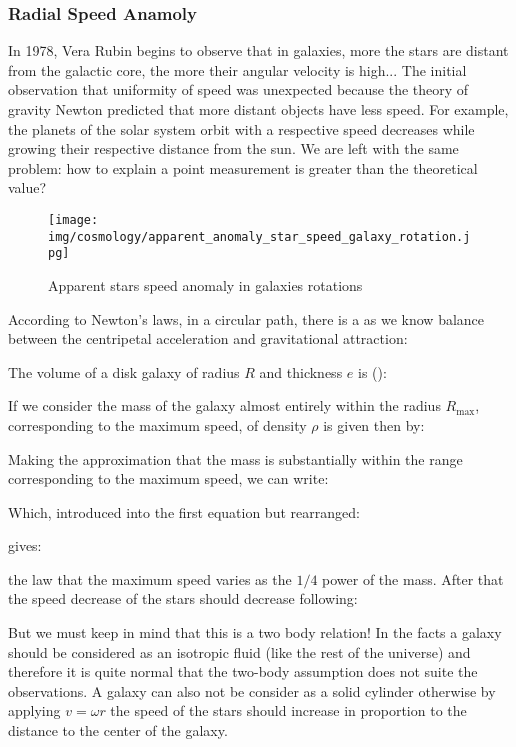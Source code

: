 	\subsubsection{Radial Speed Anamoly}
	In 1978, Vera Rubin begins to observe that in galaxies, more the stars are distant from the galactic core, the more their angular velocity is high... The initial observation that uniformity of speed was unexpected because the theory of gravity Newton predicted that more distant objects have less speed. For example, the planets of the solar system orbit with a respective speed decreases while growing their respective distance from the sun. We are left with the same problem: how to explain a point measurement is greater than the theoretical value?
	\begin{figure}[H]
		\begin{center}
		\texttt{[image: img/cosmology/apparent\_anomaly\_star\_speed\_galaxy\_rotation.jpg]}
		\end{center}	
		\caption{Apparent stars speed anomaly in galaxies rotations}
	\end{figure}
	According to Newton's laws, in a circular path, there is a as we know balance between the centripetal acceleration and gravitational attraction:
	
	The volume of a disk galaxy of radius $R$ and thickness $e$ is ():
	
	If we consider the mass of the galaxy almost entirely within the radius $R _ {\max}$, corresponding to the maximum speed, of density $\rho$ is given then by:
	
	Making the approximation that the mass is substantially within the range corresponding to the maximum speed, we can write:
	
	Which, introduced into the first equation but rearranged:
	
	 gives:
	
	the law that the maximum speed varies as the $1/4$ power of the mass. After that the speed decrease of the stars should decrease following:
	
	But we must keep in mind that this is a two body relation! In the facts a galaxy should be considered as an isotropic fluid (like the rest of the universe) and therefore it is quite normal that the two-body assumption does not suite the observations. A galaxy can also not be consider as a solid cylinder otherwise by applying $v=\omega r$ the speed of the stars should increase in proportion to the distance to the center of the galaxy.
	
